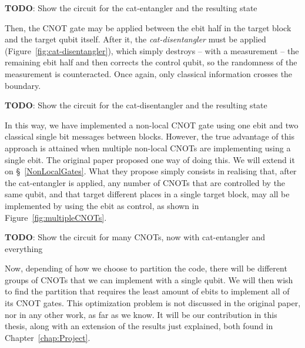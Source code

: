 \textbf{TODO}: Show the circuit for the cat-entangler and the resulting state

Then, the CNOT gate may be applied between the ebit half in the target block and the target qubit itself. After it, the \textit{cat-disentangler} must be applied (Figure~\ref{fig:cat-disentangler}), which simply destroys -- with a measurement -- the remaining ebit half and then corrects the control qubit, so the randomness of the measurement is counteracted. Once again, only classical information crosses the boundary.

\textbf{TODO}: Show the circuit for the cat-disentangler and the resulting state

In this way, we have implemented a non-local CNOT gate using one ebit and two classical single bit messages between blocks. However, the true advantage of this approach is attained when multiple non-local CNOTs are implementing using a single ebit. The original paper \citep{NonLocalCNOT} proposed one way of doing this. We will extend it on \S~\ref{NonLocalGates}. What they propose simply consists in realising that, after the cat-entangler is applied, any number of CNOTs that are controlled by the same qubit, and that target different places in a single target block, may all be implemented by using the ebit as control, as shown in Figure~\ref{fig:multipleCNOTs}.

\textbf{TODO}: Show the circuit for many CNOTs, now with cat-entangler and everything

Now, depending of how we choose to partition the code, there will be different groups of CNOTs that we can implement with a single qubit. We will then wish to find the partition that requires the least amount of ebits to implement all of its CNOT gates. This optimization problem is not discussed in the original paper, nor in any other work, as far as we know. It will be our contribution in this thesis, along with an extension of the results just explained, both found in Chapter~\ref{chap:Project}.